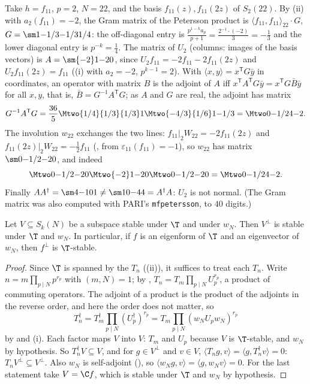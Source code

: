 \begin{example}[level $22$]\label{ex:hecke:level-22}
Take $h=f_{11}$, $p=2$, $N=22$, and the basis $f_{11}(z),f_{11}(2z)$ of $S_2(22)$. By (ii) with $a_2(f_{11})=-2$, the Gram matrix of the Petersson product is
$\langle f_{11},f_{11}\rangle_{22}\cdot G$, $G=\sm1{-1/3}{-1/3}{1/4}$: the off-diagonal entry is $\frac{p^{1-k}a_p}{p+1}=\frac{2^{-1}\cdot(-2)}3=-\frac13$ and the lower diagonal entry is
$p^{-k}=\frac14$. The matrix of $U_2$ (columns: images of the basis vectors) is $A=\sm{-2}1{-2}0$, since $U_2f_{11}=-2f_{11}-2f_{11}(2z)$ and
$U_2f_{11}(2z)=f_{11}$ ((i) with $a_2=-2$, $p^{k-1}=2$). With $\langle x,y\rangle=x^{\mathsf T}G\bar y$ in coordinates, an operator with matrix $B$ is the adjoint of
$A$ iff $x^{\mathsf T}A^{\mathsf T}G\bar y=x^{\mathsf T}G\bar B\bar y$ for all $x,y$, that is, $\bar B=G^{-1}A^{\mathsf T}G$; as $A$ and $G$ are real, the adjoint has matrix
\[
G^{-1}A^{\mathsf T}G=\frac{36}5\Mtwo{1/4}{1/3}{1/3}1\Mtwo{-4/3}{1/6}1{-1/3}=\Mtwo0{-1/2}4{-2}.
\] The involution $w_{22}$ exchanges the two lines:
$f_{11}|_2W_{22}=-2f_{11}(2z)$ and $f_{11}(2z)|_2W_{22}=-\frac12f_{11}$ (, from $\varepsilon_{11}(f_{11})=-1$), so $w_{22}$ has matrix $\sm0{-1/2}{-2}0$, and indeed
\[
\Mtwo0{-1/2}{-2}0\Mtwo{-2}1{-2}0\Mtwo0{-1/2}{-2}0=\Mtwo0{-1/2}4{-2}.
\] Finally $AA^\dagger=\sm4{-1}01\ne\sm10{-4}4=A^\dagger A$: $U_2$ is not normal. (The Gram matrix was also computed with PARI's
\texttt{mfpetersson}, to $40$ digits.)
\end{example}

\begin{corollary}\label{cor:hecke:perp-stable}
Let $V\subseteq S_k(N)$ be a subspace stable under $\T$ and under $w_N$. Then $V^\perp$ is stable under $\T$ and $w_N$. In particular, if $f$ is an eigenform of $\T$ and an
eigenvector of $w_N$, then $f^\perp$ is $\T$-stable.
\end{corollary}

\begin{proof}
Since $\T$ is spanned by the $T_n$ ((ii)), it suffices to treat each $T_n$. Write $n=m\prod_{p\mid N}p^{r_p}$ with $(m,N)=1$; by ,
$T_n=T_m\prod_{p\mid N}U_p^{r_p}$, a product of commuting operators. The adjoint of a product is the product of the adjoints in the reverse order, and here the order does not
matter, so
\[
T_n^\dagger=T_m^\dagger\prod_{p\mid N}(U_p^\dagger)^{r_p}=T_m\prod_{p\mid N}(w_NU_pw_N)^{r_p}
\]
by  and (i). Each factor maps $V$ into $V$: $T_m$ and $U_p$ because $V$ is $\T$-stable, and $w_N$ by hypothesis. So
$T_n^\dagger V\subseteq V$, and for $g\in V^\perp$ and $v\in V$, $\langle T_ng,v\rangle=\langle g,T_n^\dagger v\rangle=0$: $T_nV^\perp\subseteq V^\perp$. Also $w_N$ is self-adjoint (), so
$\langle w_Ng,v\rangle=\langle g,w_Nv\rangle=0$. For the last statement take $V=\C f$, which is stable under $\T$ and $w_N$ by hypothesis.
\end{proof}

